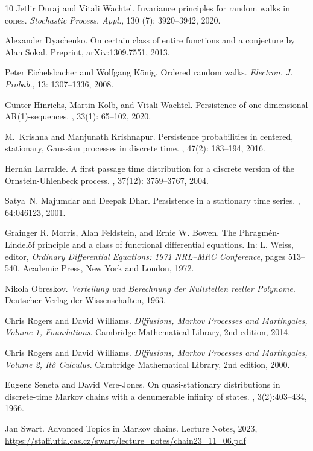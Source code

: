 \documentclass[12pt]{article}
\newcommand{\1}{\mathds{1}}
\theoremstyle{definition}
\theoremstyle{plain}
\theoremstyle{remark}
\begin{document}
\begin{thebibliography}{10}
Jetlir Duraj and Vitali Wachtel.
\newblock Invariance principles for random walks in cones. {\em Stochastic Process. Appl.}, 130 (7): 3920--3942, 2020.

Alexander Dyachenko.
\newblock On certain class of entire functions and a conjecture by Alan Sokal. Preprint, 	arXiv:1309.7551, 2013.

Peter Eichelsbacher and Wolfgang K\"onig.
\newblock Ordered random walks. {\em Electron. J. Probab.}, 13: 1307--1336, 2008.

G{\"u}nter Hinrichs, Martin Kolb, and Vitali Wachtel.
\newblock Persistence of one-dimensional {AR}(1)-sequences.
, 33(1): 65--102, 2020.

M.~Krishna and Manjunath Krishnapur.
\newblock Persistence probabilities in centered, stationary, {Gaussian}
  processes in discrete time.
, 47(2): 183--194, 2016.

Hern\'an Larralde.
\newblock A first passage time distribution for a discrete version of the
  {O}rnstein-{U}hlenbeck process.
, 37(12): 3759--3767, 2004.

Satya~N. Majumdar and Deepak Dhar.
\newblock Persistence in a stationary time series.
, 64:046123, 2001.

Grainger R. Morris, Alan Feldstein, and Ernie W. Bowen.
\newblock The Phragm\'en-Lindel\"of principle and a class of functional differential equations. In: L. Weiss, editor, {\em Ordinary Differential Equations:
1971 NRL--MRC Conference}, pages 513--540.
Academic Press, New York and London, 1972.

Nikola Obreskov. {\em Verteilung und Berechnung der Nullstellen reeller Polynome}. Deutscher Verlag der Wissenschaften, 1963.

Chris Rogers and David Williams. {\em Diffusions, Markov Processes and Martingales, Volume 1, Foundations}. Cambridge Mathematical Library, 2nd edition, 2014.

Chris Rogers and David Williams. {\em Diffusions, Markov Processes and Martingales, Volume 2, It\^{o} Calculus}. Cambridge Mathematical Library, 2nd edition, 2000.

Eugene Seneta and David Vere-Jones.
\newblock On quasi-stationary distributions in discrete-time Markov chains with a denumerable infinity of states.
, 3(2):403--434, 1966.


Jan Swart.
Advanced Topics
in Markov chains. Lecture Notes, 2023,
 \url{https://staff.utia.cas.cz/swart/lecture\_notes/chain23\_11\_06.pdf}

\end{thebibliography}
\end{document}

